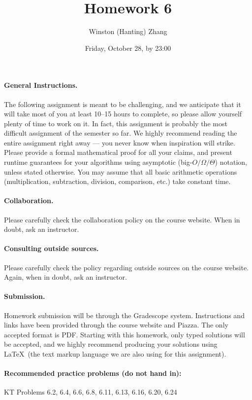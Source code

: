 \documentclass[10pt]{article}
\title{\bf Homework 6}
\author{Winston (Hanting) Zhang}
\date{Friday, October 28, by 23:00}
\begin{document}
\maketitle

\paragraph{General Instructions.} The following assignment is meant to be challenging, and we anticipate that it will take most of you at least 10--15 hours to complete, so please allow yourself plenty of time to work on it. In fact, this assignment is probably the most difficult assignment of the semester so far.
We highly recommend reading the entire assignment right away --- you never know when inspiration will strike.
Please provide a formal mathematical proof for all your claims, and  present runtime guarantees for your algorithms using asymptotic (big-$O/\Omega/\Theta$) notation, unless stated otherwise. You may assume that all basic arithmetic operations (multiplication, subtraction, division, comparison, etc.) take constant time. %

\paragraph{Collaboration.}  Please carefully check the collaboration policy on the course website. When in doubt, ask an instructor.

\paragraph{Consulting outside sources.} Please carefully check the policy regarding outside sources on the course website. Again, when in doubt, ask an instructor.

\paragraph{Submission.} Homework submission will be through the Gradescope system. Instructions and links have been provided through the course website and Piazza. The only accepted format is PDF. Starting with this homework, only typed solutions will be accepted, and we highly recommend producing your solutions using \LaTeX~(the text markup language we are also using for this assignment).

\paragraph{Recommended practice problems (do not hand in):} KT Problems 6.2, 6.4, 6.6, 6.8, 6.11, 6.13, 6.16, 6.20, 6.24
\end{document}
